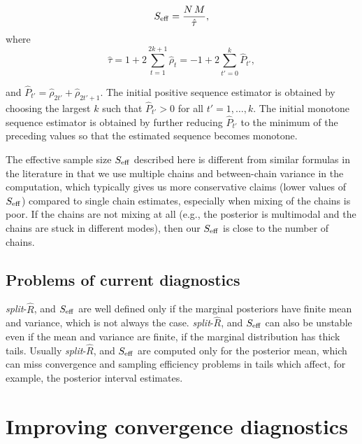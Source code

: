 \documentclass[american,]{article}
\begin{document}
\begin{equation}
S_{\rm eff} = \frac{N \, M}{\hat{\tau}},
\end{equation} where \begin{equation}
\hat{\tau} = 1 + 2 \sum_{t=1}^{2k+1} \hat{\rho}_t = 
-1 + 2 \sum_{t'=0}^{k} \hat{P}_{t'},
\end{equation}

and \(\hat{P}_{t'}=\hat{\rho}_{2t'}+\hat{\rho}_{2t'+1}\). The initial
positive sequence estimator is obtained by choosing the largest \(k\)
such that \(\hat{P}_{t'}>0\) for all \(t' = 1,\ldots,k\). The initial
monotone sequence estimator is obtained by further reducing
\(\hat{P}_{t'}\) to the minimum of the preceding values so that the
estimated sequence becomes monotone.

The effective sample size \(S_{\rm eff}\) described here is different
from similar formulas in the literature in that we use multiple chains
and between-chain variance in the computation, which typically gives us
more conservative claims (lower values of \(S_{\rm eff}\)) compared to
single chain estimates, especially when mixing of the chains is poor. If
the chains are not mixing at all (e.g., the posterior is multimodal and
the chains are stuck in different modes), then our \(S_{\rm eff}\) is
close to the number of chains.

\hypertarget{problems-of-current-diagnostics}{%
\subsection{Problems of current
diagnostics}\label{problems-of-current-diagnostics}}

\emph{split}-\(\widehat{R}\), and \(S_{\rm eff}\) are well defined
only if the marginal posteriors have finite mean and variance, which is not always the case. \emph{split}-\(\widehat{R}\), and \(S_{\rm eff}\) can also be unstable even if the mean and variance are finite, if the marginal distribution has thick tails. Usually \emph{split}-\(\widehat{R}\), and \(S_{\rm eff}\) are computed only for the posterior mean, which can miss convergence and sampling efficiency problems in tails which affect, for example, the posterior interval estimates.

\hypertarget{improving-convergence-diagnostics}{%
\section{Improving convergence
diagnostics}\label{improving-convergence-diagnostics}}
\end{document}
